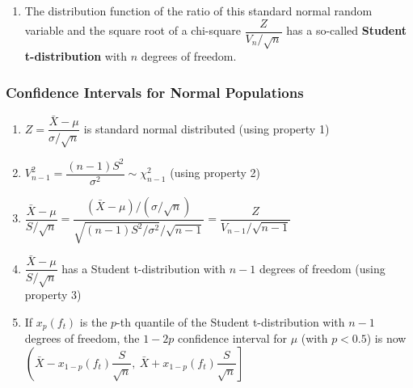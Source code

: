 \begin{enumerate}
\begin{enumerate}
\begin{enumerate}
            \item The distribution function of the ratio of this standard normal random variable and the square root of a chi-square $\dfrac{Z}{V_n /\sqrt{n}}$ has a so-called \textbf{Student t-distribution} with $n$ degrees of freedom. \hfill \cite{statistics/book/Statistics-for-Data-Scientists/Maurits-Kaptein}
        \end{enumerate}
    \end{enumerate}
\end{enumerate}


\subsubsection{Confidence Intervals for Normal Populations}

\begin{enumerate}
    \item $Z =\dfrac{\bar{X} - \mu}{\sigma/\sqrt{n}}$ is standard normal distributed
    \hfill (using property 1)
    \cite{statistics/book/Statistics-for-Data-Scientists/Maurits-Kaptein}

    \item $V ^2 _{n-1} = \dfrac{(n - 1)S^2}{\sigma^ 2} \sim \chi^2 _{n-1}$
    \hfill (using property 2)
    \cite{statistics/book/Statistics-for-Data-Scientists/Maurits-Kaptein}

    \item
    $
        \dfrac{\bar{X} - \mu }{S/\sqrt{n} }
        = \dfrac{( \bar{X} - \mu )/ (\sigma /\sqrt{n})}{\sqrt{(n - 1)S^2/\sigma ^ 2}/\sqrt{n - 1} }
        = \dfrac{Z}{V_{n-1}/\sqrt{n - 1} }
    $
    \hfill\cite{statistics/book/Statistics-for-Data-Scientists/Maurits-Kaptein}

    \item $\dfrac{\bar{X} - \mu }{S/\sqrt{n} }$ has a Student t-distribution with $n - 1$ degrees of freedom
    \hfill (using property 3)
    \cite{statistics/book/Statistics-for-Data-Scientists/Maurits-Kaptein}

    \item If $x _p ( f _t )$ is the $p$-th quantile of the Student t-distribution with $n - 1$ degrees of freedom, the $1 - 2 p$ confidence interval for $\mu$ (with $p < 0.5$) is now
    $
        \left (
            \bar{X} - x_{1- p} ( f _t ) \dfrac{S}{\sqrt{n}} ,
            \ \bar{X} + x_{1- p} ( f _t ) \dfrac{S}{\sqrt{n}}
        \right ]
    $
    \hfill\cite{statistics/book/Statistics-for-Data-Scientists/Maurits-Kaptein}


\end{enumerate}

